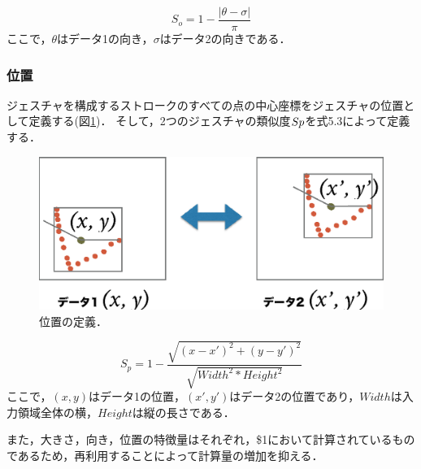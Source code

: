 \begin{equation}
S_\textit{o} = 1 - \frac{|\theta - \sigma|}{\pi}
\end{equation}
ここで，$\theta$はデータ1の向き，$\sigma$はデータ2の向きである．


\subsubsection{位置}
ジェスチャを構成するストロークのすべての点の中心座標をジェスチャの位置として定義する(図\ref{fig:v_position})．
そして，2つのジェスチャの類似度$S{\scriptsize p}$を式5.3によって定義する．

\begin{figure} [h!]
	\begin{center}
		\includegraphics [width=0.6\hsize ]{img/v_position.eps}
	\end{center}
	\caption{位置の定義．}
	\label{fig:v_position}
\end{figure}


\begin{equation}
S_\textit{p} = 1 - \frac{\sqrt{(x - x')^2 + (y - y')^2}}{\sqrt{W\!idt\!h^2 * H\!ei\!ght^2}}
\end{equation}
ここで，$(x, y)$はデータ1の位置，$(x', y')$はデータ2の位置であり，$Width$は入力領域全体の横，$Height$は縦の長さである．

また，大きさ，向き，位置の特徴量はそれぞれ，\$1において計算されているものであるため，再利用することによって計算量の増加を抑える．

